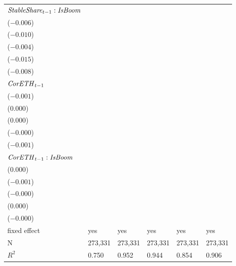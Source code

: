 \begin{tabular}{llllll}
${{\it StableShare}}_{t-1} : {\it IsBoom}$  &  \makecell{$-0.011^{***}$ \\ ($-0.006$)} &  \makecell{$-0.009^{***}$ \\ ($-0.010$)} &  \makecell{$-0.005^{***}$ \\ ($-0.004$)} &  \makecell{$-0.015^{***}$ \\ ($-0.015$)} &  \makecell{$-0.006^{***}$ \\ ($-0.008$)} \\
${{\it CorETH}}_{t-1}$                      &  \makecell{$-0.000^{***}$ \\ ($-0.001$)} &       \makecell{$0.000^{}$ \\ ($0.000$)} &       \makecell{$0.000^{}$ \\ ($0.000$)} &     \makecell{$-0.000^{}$ \\ ($-0.000$)} &   \makecell{$-0.000^{**}$ \\ ($-0.001$)} \\
${{\it CorETH}}_{t-1} : {\it IsBoom}$       &       \makecell{$0.000^{}$ \\ ($0.000$)} &     \makecell{$-0.000^{}$ \\ ($-0.001$)} &     \makecell{$-0.000^{}$ \\ ($-0.000$)} &       \makecell{$0.000^{}$ \\ ($0.000$)} &     \makecell{$-0.000^{}$ \\ ($-0.000$)} \\
\midrule fixed effect                       &                                      yes &                                      yes &                                      yes &                                      yes &                                      yes \\
N                                           &                                  273,331 &                                  273,331 &                                  273,331 &                                  273,331 &                                  273,331 \\
$R^2$                                       &                                    0.750 &                                    0.952 &                                    0.944 &                                    0.854 &                                    0.906 \\
\bottomrule
\end{tabular}
